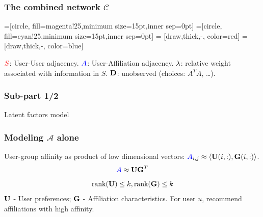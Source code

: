 \documentclass{beamer}
\begin{document}
\begin{frame}
\frametitle{The combined network $\mathcal{C}$}
=[circle, fill=magenta!25,minimum size=15pt,inner sep=0pt]
=[circle, fill=cyan!25,minimum size=15pt,inner sep=0pt]
 = [draw,thick,-, color=red]
 = [draw,thick,-, color=blue]
\pause
{}
\begin{itemize}
 \pitem $\textcolor{red}{S}$: User-User adjacency.
 \pitem $\textcolor{blue}{A}$: User-Affiliation adjacency.
 \pitem $\lambda$: relative weight associated with information in $S$.
 \pitem $\mathbf{D}$: unobserved (choices: $A^{T}A$, \dots).
\end{itemize}
\end{frame}

\begin{frame}
\frametitle{Sub-part 1/2}
  \hspace{1.1in}
  \centerline{\huge{Latent factors model}}
\end{frame}

\begin{frame}
\frametitle{Modeling $\mathcal{A}$ alone}
\begin{itemize}
\pitem User-group affinity as product of low dimensional vectors: $\textcolor{blue}{A}_{i, j} \approx \langle\mathbf{U}(i, :), \mathbf{G}(i, :)\rangle$.
\pause
\[ \textcolor{blue}{A} \approx \mathbf{U} \mathbf{G}^{T} \] 
\[ \text{rank}(\mathbf{U}) \leq k, \text{rank}(\mathbf{G}) \leq k \]
$\mathbf{U}$ - User preferences; $\mathbf{G}$ - Affiliation characteristics.
\pitem For user $u$, recommend affiliations with high affinity.
\end{itemize}
\end{frame}
\end{document}

